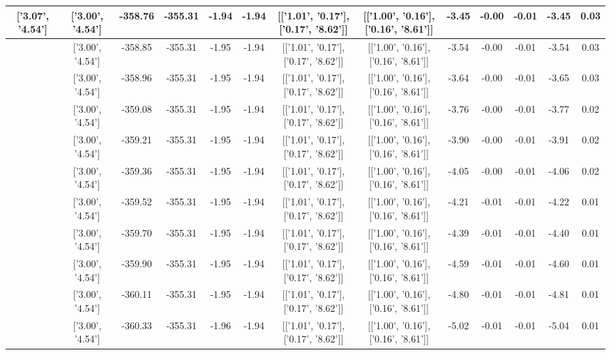 \begin{table}[htbp]
\begin{adjustbox}{angle=90}
\begin{tabular}{|c|c|c|c|c|c|c|c|c|c|c|c|c|}
 ['3.07', '4.54'] & ['3.00', '4.54'] & -358.76 & -355.31 & -1.94 & -1.94 & [['1.01', '0.17'], ['0.17', '8.62']] & [['1.00', '0.16'], ['0.16', '8.61']] & -3.45 & -0.00 & -0.01 & -3.45 & 0.03\\ \hline
 ['3.08', '4.54'] & ['3.00', '4.54'] & -358.85 & -355.31 & -1.95 & -1.94 & [['1.01', '0.17'], ['0.17', '8.62']] & [['1.00', '0.16'], ['0.16', '8.61']] & -3.54 & -0.00 & -0.01 & -3.54 & 0.03\\ \hline
 ['3.09', '4.54'] & ['3.00', '4.54'] & -358.96 & -355.31 & -1.95 & -1.94 & [['1.01', '0.17'], ['0.17', '8.62']] & [['1.00', '0.16'], ['0.16', '8.61']] & -3.64 & -0.00 & -0.01 & -3.65 & 0.03\\ \hline
 ['3.10', '4.55'] & ['3.00', '4.54'] & -359.08 & -355.31 & -1.95 & -1.94 & [['1.01', '0.17'], ['0.17', '8.62']] & [['1.00', '0.16'], ['0.16', '8.61']] & -3.76 & -0.00 & -0.01 & -3.77 & 0.02\\ \hline
 ['3.11', '4.55'] & ['3.00', '4.54'] & -359.21 & -355.31 & -1.95 & -1.94 & [['1.01', '0.17'], ['0.17', '8.62']] & [['1.00', '0.16'], ['0.16', '8.61']] & -3.90 & -0.00 & -0.01 & -3.91 & 0.02\\ \hline
 ['3.13', '4.55'] & ['3.00', '4.54'] & -359.36 & -355.31 & -1.95 & -1.94 & [['1.01', '0.17'], ['0.17', '8.62']] & [['1.00', '0.16'], ['0.16', '8.61']] & -4.05 & -0.00 & -0.01 & -4.06 & 0.02\\ \hline
 ['3.14', '4.55'] & ['3.00', '4.54'] & -359.52 & -355.31 & -1.95 & -1.94 & [['1.01', '0.17'], ['0.17', '8.62']] & [['1.00', '0.16'], ['0.16', '8.61']] & -4.21 & -0.01 & -0.01 & -4.22 & 0.01\\ \hline
 ['3.15', '4.55'] & ['3.00', '4.54'] & -359.70 & -355.31 & -1.95 & -1.94 & [['1.01', '0.17'], ['0.17', '8.62']] & [['1.00', '0.16'], ['0.16', '8.61']] & -4.39 & -0.01 & -0.01 & -4.40 & 0.01\\ \hline
 ['3.16', '4.55'] & ['3.00', '4.54'] & -359.90 & -355.31 & -1.95 & -1.94 & [['1.01', '0.17'], ['0.17', '8.62']] & [['1.00', '0.16'], ['0.16', '8.61']] & -4.59 & -0.01 & -0.01 & -4.60 & 0.01\\ \hline
 ['3.17', '4.55'] & ['3.00', '4.54'] & -360.11 & -355.31 & -1.95 & -1.94 & [['1.01', '0.17'], ['0.17', '8.62']] & [['1.00', '0.16'], ['0.16', '8.61']] & -4.80 & -0.01 & -0.01 & -4.81 & 0.01\\ \hline
 ['3.19', '4.55'] & ['3.00', '4.54'] & -360.33 & -355.31 & -1.96 & -1.94 & [['1.01', '0.17'], ['0.17', '8.62']] & [['1.00', '0.16'], ['0.16', '8.61']] & -5.02 & -0.01 & -0.01 & -5.04 & 0.01\\ \hline

\end{tabular}
\end{adjustbox}
\end{table}
